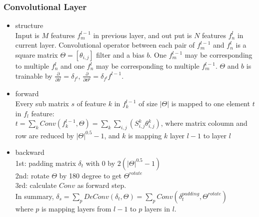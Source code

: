 \begin{frame}
\frametitle{Convolutional Layer}
	\scriptsize 
	\begin{itemize}
		\item structure
		\\\hspace{0.5cm}	Input is $M$ features $f_{m}^{l-1}$ in previous layer, and out put is $N$ features $f_{n}^l$ in current layer. Convolutional operator between each pair of $f_{m}^{l-1}$ and $f_{n}^{l}$ is a square matrix $\Theta=[\theta_{i,j}]$ filter and a bias $b$. One $f_{m}^{l-1}$ may be corresponding to multiple $f_n^{l}$ and one $f_n^{l}$ may be corresponding to multiple $f_m^{l-1}$. $\Theta$ and $b$ is trainable by
		$\frac{\partial}{\partial{b^l}}=\delta_{f^l}$,
		$\frac{\partial}{\partial{\Theta^l}}=\delta_{f^l}f^{l-1}$.
		\item forward 
		\\\hspace{0.5cm}	Every sub matrix $s$ of feature $k$ in $f_k^{l-1}$ of size $|\Theta|$ is mapped to one element $t$ in $f_{l}$ feature:
		\\\hspace{0.5cm} $t=\sum_{k}Conv(f_k^{l-1},\Theta)=\sum_{k}\sum_{i,j}(S_{i,j}^k\theta_{i,j}^k)$, 
			where matrix coloumn and row are reduced by $|\Theta|^{0.5}-1$, and $k$ is mapping $k$ layer $l-1$ to layer $l$
		\item backward 
		\\\hspace{0.5cm} 1st: padding matrix $\delta_t$ with 0 by $2(|\Theta|^{0.5}-1)$
		\\\hspace{0.5cm} 2nd: rotate $\Theta$ by 180 degree to get $\Theta^{rotate}$ 
		\\\hspace{0.5cm} 3rd: calculate $Conv$ as forward step.
		\\\hspace{0.5cm} In summary,	$\delta_s=\sum_{p}DeConv(\delta_t,\Theta)=\sum_{p}Conv(\delta_t^{padding},\Theta^{rotate})$
		\\\hspace{1cm}where $p$ is mapping layers from $l-1$ to $p$ layers in $l$.
	\end{itemize}
\end{frame}
